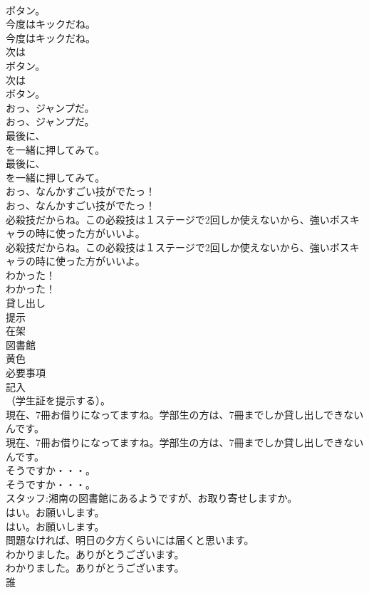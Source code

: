 \documentclass[8pt]{extreport}
\begin{document}
\begin{CJK}{UTF8}{min}
\\	ボタン。 
\\	今度はキックだね。	
\\	今度はキックだね。 
\\	次は
\\	ボタン。	
\\	次は
\\	ボタン。 
\\	おっ、ジャンプだ。	
\\	おっ、ジャンプだ。 
\\	最後に、
\\	を一緒に押してみて。	
\\	最後に、
\\	を一緒に押してみて。 
\\	おっ、なんかすごい技がでたっ！	
\\	おっ、なんかすごい技がでたっ！ 
\\	必殺技だからね。この必殺技は１ステージで2回しか使えないから、強いボスキャラの時に使った方がいいよ。	
\\	必殺技だからね。この必殺技は１ステージで2回しか使えないから、強いボスキャラの時に使った方がいいよ。 
\\	わかった！	
\\	わかった！ 
\\	貸し出し
\\	提示
\\	在架
\\	図書館
\\	黄色
\\	必要事項
\\	記入
\\	（学生証を提示する）。	
\\	現在、7冊お借りになってますね。学部生の方は、7冊までしか貸し出しできないんです。	
\\	現在、7冊お借りになってますね。学部生の方は、7冊までしか貸し出しできないんです。 
\\	そうですか・・・。	
\\	そうですか・・・。 
\\	スタッフ:湘南の図書館にあるようですが、お取り寄せしますか。	
\\	はい。お願いします。	
\\	はい。お願いします。 
\\	問題なければ、明日の夕方くらいには届くと思います。	
\\	わかりました。ありがとうございます。	
\\	わかりました。ありがとうございます。 
\\	誰

\end{CJK}
\end{document}
